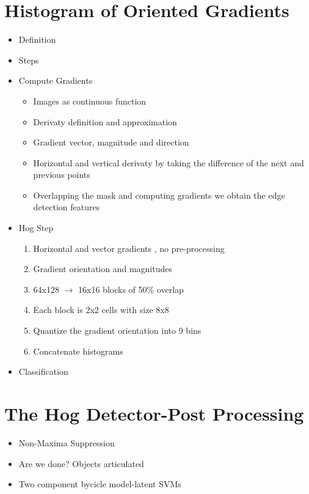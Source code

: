 \documentclass[12pt,oneside]{report}
\begin{document}
\section{Histogram of Oriented Gradients}
\begin{itemize}
    \item Definition
    \item Steps
    \item Compute Gradients
    \begin{itemize}
        \item Images as continuous function
        \item Derivaty definition and approximation
        \item Gradient vector, magnitude and direction
        \item Horizontal and vertical derivaty by taking the difference of the next and previous points
        \item Overlapping the mask and computing gradients we obtain the edge detection features
    \end{itemize}
    \item Hog Step
    \begin{enumerate}
        \item Horizontal and vector gradients , no pre-processing
        \item Gradient orientation and magnitudes
        \item 64x128 \(\rightarrow\) 16x16 blocks of 50\% overlap
        \item Each block is 2x2 cells with size 8x8
        \item Quantize the gradient orientation into 9 bins
        \item Concatenate histograms
    \end{enumerate}
    \item Classification
\end{itemize}

\section{The Hog Detector-Post Processing}
\begin{itemize}
    \item Non-Maxima Suppression
    \item Are we done? Objects articulated
    \item Two component bycicle model-latent SVMs
\end{itemize}
\end{document}
